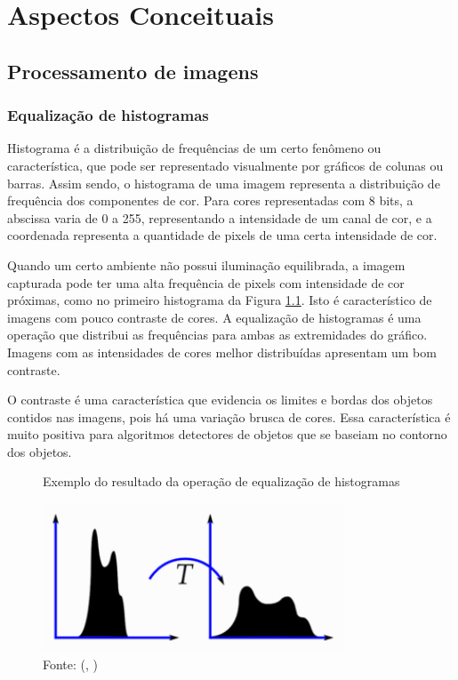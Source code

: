 \documentclass[]{politex}
\begin{document}
\chapter{Aspectos Conceituais}

\section{Processamento de imagens}
\subsection{Equalização de histogramas} \label{histogramas}
Histograma é a distribuição de frequências de um certo fenômeno ou característica, que pode ser representado visualmente por gráficos de colunas ou barras. Assim sendo, o histograma de uma imagem representa a distribuição de frequência dos componentes de cor. Para cores representadas com 8 bits, a abscissa varia de 0 a 255, representando a intensidade de um canal de cor, e a coordenada representa a quantidade de pixels de uma certa intensidade de cor.

Quando um certo ambiente não possui iluminação equilibrada, a imagem capturada pode ter uma alta frequência de pixels com intensidade de cor próximas, como no primeiro histograma da Figura \ref{fig:opencv_histograma}. Isto é característico de imagens com pouco contraste de cores. A equalização de histogramas é uma operação que distribui as frequências para ambas as extremidades do gráfico. Imagens com as intensidades de cores melhor distribuídas apresentam um bom contraste.

O contraste é uma característica que evidencia os limites e bordas dos objetos contidos nas imagens, pois há uma variação brusca de cores. Essa característica é muito positiva para algoritmos detectores de objetos que se baseiam no contorno dos objetos.

\begin{figure}[H]
    \centering
    \caption{Exemplo do resultado da operação de equalização de histogramas}
    \includegraphics[width=0.8\textwidth]{opencv_histograma}
    \caption*{Fonte: (, \citeyear{opencvtutorials})}
    \label{fig:opencv_histograma}
\end{figure}
\end{document}
